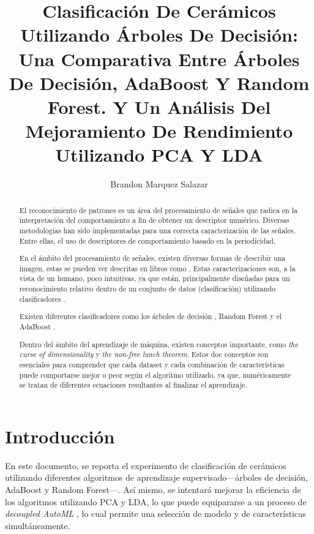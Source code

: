 \documentclass[9pt, journal]{IEEEtran}
\author{%
Brandon Marquez Salazar
}
\title{%
  Clasificación De Cerámicos Utilizando Árboles De Decisión:
  Una Comparativa Entre Árboles De Decisión, AdaBoost Y Random Forest.
  Y Un Análisis Del Mejoramiento De Rendimiento Utilizando PCA Y LDA
}
\begin{document}
  \maketitle

  \begin{abstract}
    El reconocimiento de patrones es un área del procesamiento de señales que radica en la interpretación
    del comportamiento a fin de obtener un descriptor numérico. Diversas metodologías han sido implementadas para
    una correcta caracterización de las señales. Entre ellas, el uso de descriptores de comportamiento
    basado en la periodicidad.

    En el ámbito del procesamiento de señales, existen diversas formas de describir una imagen, estas
    se pueden ver descritas en libros como \cite{M2006-tk, Duda2012, Jain1988-ab}.
    Estas caracterizaciones son, a la vista de un humano, poco intuitivas, ya que están, principalmente 
    diseñadas para un reconocimiento relativo dentro de un conjunto de datos (clasificación) utilizando
    clasificadores \cite{Bishop2006}.

    Existen diferentes clasificadores como los árboles de decisión \cite{Quinlan1986}, Random Forest \cite{Breiman2001}
    y el AdaBoost \cite{Zhou2012}.

    Dentro del ámbito del aprendizaje de máquina, existen conceptos importante, como \textit{the curse of 
    dimensionality}\cite{9780691652214_Richard-E.-Bellman} y \textit{the non-free lunch theorem}\cite{NoFreeLunch6795940}.
    Estos doc conceptos son esenciales para comprender que cada dataset y cada combinación de características
    puede comportarse mejor o peor según el algoritmo utilizado, ya que, numéricamente se tratan de diferentes
    ecuaciones resultantes al finalizar el aprendizaje.
  \end{abstract}

  \section{Introducción}
    En este documento, se reporta el experimento de clasificación de cerámicos utilizando diferentes
    algoritmos de aprendizaje supervisado---árboles de decisión, AdaBoost y Random Forest---. Así mismo,
    se intentará mejorar la eficiencia de los algoritmos utilizando PCA y LDA, lo que puede equipararse
    a un proceso de \textit{decoupled AutoML} \cite{QUEMY2020101483}, lo cual permite una selección
    de modelo y de características simultáneamente. 
\end{document}
